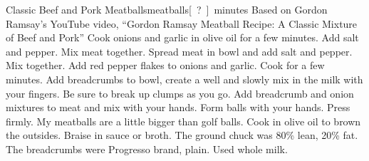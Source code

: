 \begin{recipe}{Classic Beef and Pork Meatballs}{\unit[15]{meatballs}}{\unit[?]{minutes}}
\freeform Based on Gordon Ramsay's YouTube video, ``Gordon Ramsay
Meatball Recipe: A Classic Mixture of Beef and Pork''
Cook onions and garlic in olive oil for a few minutes. Add salt and
pepper.
Mix meat together. Spread meat in bowl and add salt and pepper. Mix
together.
Add red pepper flakes to onions and garlic. Cook for a few minutes.
Add breadcrumbs to bowl, create a well and slowly mix in the milk with
your fingers. Be sure to break up clumps as you go.
\newstep Add breadcrumb and onion mixtures to meat and mix with your
hands.
\newstep Form balls with your hands. Press firmly. My
meatballs are a little bigger than golf balls.
\newstep Cook in olive oil to brown the outsides. Braise in sauce or broth.
\freeform The ground chuck was 80\% lean, 20\% fat. The breadcrumbs
were Progresso brand, plain. Used whole milk.
\end{recipe}
